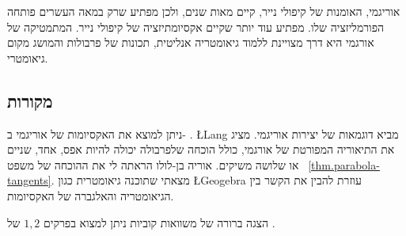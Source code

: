 אוריגמי, האומנות של קיפולי נייר, קיים מאות שנים, ולכן מפתיע שרק במאה העשרים פותחה הפורמליזציה שלו. מפתיע עוד יותר שקיים אקסיומתיזציה של קיפולי נייר. המתמטיקה של אורגמי היא דרך מצויינת ללמוד גיאומטריה אנליטית, תכונות של פרבולות והמושג מקום גיאומטרי.

\subsection*{מקורות}

ניתן למוצא את האקסיומות של אוריגמי ב-%
\cite{wiki:hh-axioms}.
\L{Lang}
\cite{lang}
מביא דוגמאות של יצירות אוריגמי.
\cite[Chap.~10]{martin}
מציג את התיאוריה המפורטת של אורגמי, כולל הוכחה שלפרבולה יכולה להיות אפס, אחד, שניים או שלושה משיקים. אוריה בן-לולו הראתה לי את ההוכחה של משפט%
~\ref{thm.parabola-tangents}.
מצאתי שתוכנה גיאומטרית כגון 
\L{Geogebra}
עוזרת להבין את הקשר בין הגיאומטריה והאלגברה של האקסיומות.

הצגה ברורה של משוואות קוביות ניתן למצוא בפרקים
$1,2$
של
\cite{jorg}.
